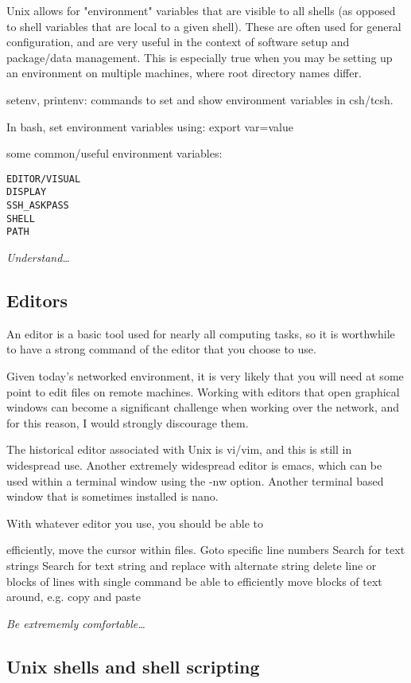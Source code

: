 \documentclass{article}
\newcommand{\test}[1]{%
    \begin{center}
        \colorbox{hl}{\parbox{0.9\textwidth}{\emph{#1}}}
    \end{center}}
\begin{document}
Unix allows for "environment" variables that are visible to all shells
(as opposed to shell variables that are local to a given shell). These
are often used for general configuration, and are very useful in the
context of software setup and package/data management. This is
especially true when you may be setting up an environment on multiple
machines, where root directory names differ.

setenv, printenv: commands to set and show environment variables in
csh/tcsh.

In bash, set environment variables using: export var=value

some common/useful environment variables:
\begin{verbatim}
EDITOR/VISUAL
DISPLAY
SSH_ASKPASS
SHELL
PATH
\end{verbatim}

\test{Understand\ldots}

\subsection{Editors}
An editor is a basic tool used for nearly all computing tasks, so it
is worthwhile to have a strong command of the editor that you choose
to use.

Given today's networked environment, it is very likely that you will
need at some point to edit files on remote machines. Working with
editors that open graphical windows can become a significant challenge
when working over the network, and for this reason, I would strongly
discourage them.

The historical editor associated with Unix is vi/vim, and this is
still in widespread use. Another extremely widespread editor is emacs,
which can be used within a terminal window using the -nw option.
Another terminal based window that is sometimes installed is nano.

With whatever editor you use, you should be able to

efficiently, move the cursor within files. Goto specific line numbers
Search for text strings
Search for text string and replace with alternate string
delete line or blocks of lines with single command
be able to efficiently move blocks of text around, e.g. copy and paste

\test{Be extrememly comfortable\ldots}



\subsection{Unix shells and shell scripting}
\end{document}
